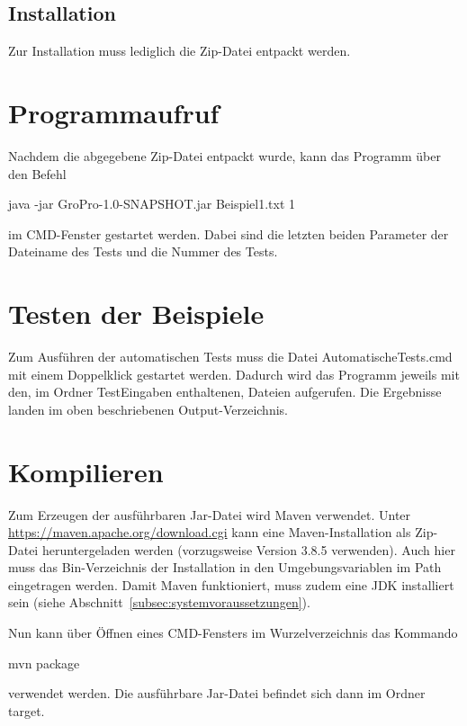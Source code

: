 \subsection{Installation}\label{subsec:installation}
Zur Installation muss lediglich die Zip-Datei entpackt werden.

\section{Programmaufruf}\label{sec:programmaufruf}
Nachdem die abgegebene Zip-Datei entpackt wurde, kann das Programm über den Befehl
\begin{center}
    \colorbox{gray!20}{
        \begin{minipage}{0.9\textwidth}
            java -jar GroPro-1.0-SNAPSHOT.jar Beispiel1.txt 1
        \end{minipage}
    }
\end{center}
im CMD-Fenster gestartet werden.
Dabei sind die letzten beiden Parameter der Dateiname des Tests und die Nummer des Tests.

\section{Testen der Beispiele}\label{sec:testen-der-beispiele}
Zum Ausführen der automatischen Tests muss die Datei \glqq AutomatischeTests.cmd \grqq{} mit einem Doppelklick gestartet werden.
Dadurch wird das Programm jeweils mit den, im Ordner \glqq TestEingaben \grqq{} enthaltenen, Dateien aufgerufen.
Die Ergebnisse landen im oben beschriebenen Output-Verzeichnis.

\section{Kompilieren}\label{sec:kompilieren}

Zum Erzeugen der ausführbaren Jar-Datei wird Maven verwendet.
Unter \url{https://maven.apache.org/download.cgi} kann eine Maven-Installation als Zip-Datei heruntergeladen werden (vorzugsweise Version 3.8.5 verwenden).
Auch hier muss das Bin-Verzeichnis der Installation in den Umgebungsvariablen im Path eingetragen werden.
Damit Maven funktioniert, muss zudem eine JDK installiert sein (siehe Abschnitt~\ref{subsec:systemvoraussetzungen}).

Nun kann über Öffnen eines CMD-Fensters im Wurzelverzeichnis das Kommando
\begin{center}
    \colorbox{gray!20}{
        \begin{minipage}{0.9\textwidth}
            mvn package
        \end{minipage}
    }
\end{center}
verwendet werden.
Die ausführbare Jar-Datei befindet sich dann im Ordner \glqq target\grqq{}.
